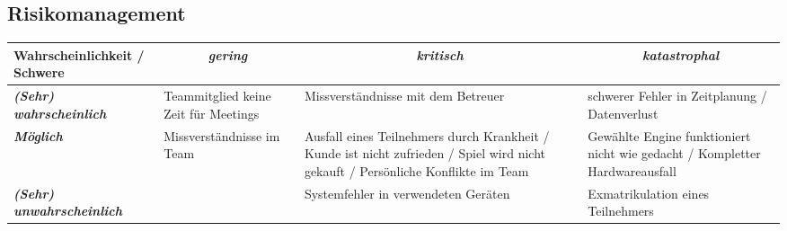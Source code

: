 

\subsection{Risikomanagement}
\begin{tabular}{|p{4cm}|p{3cm}|p{3.5cm}|p{3.5cm}|}
\hline
{\textbf{Wahrscheinlichkeit / Schwere}} & \multicolumn{1}{c|}{\textit{\textbf{gering}}}  & \multicolumn{1}{c|}{\textit{\textbf{kritisch}}}  	& \multicolumn{1}{c|}{\textit{\textbf{katastrophal}}} \\ \hline
\textit{\textbf{(Sehr) wahrscheinlich}} &
\cellcolor[HTML]{FCFF2F}Teammitglied keine Zeit für Meetings 	& \cellcolor[HTML]{FE0000}Missverständnisse mit dem Betreuer & \cellcolor[HTML]{FE0000}schwerer Fehler in Zeitplanung / Datenverlust     \\ \hline
\textit{\textbf{Möglich}}               &
\cellcolor[HTML]{34FF34}Missverständnisse im Team            	& \cellcolor[HTML]{F8FF00}Ausfall eines Teilnehmers durch Krankheit / Kunde ist nicht zufrieden / Spiel wird nicht gekauft / Persönliche Konflikte im Team & \cellcolor[HTML]{F8FF00}Gewählte Engine funktioniert nicht wie gedacht / Kompletter Hardwareausfall 				  \\ \hline
\textit{\textbf{(Sehr) unwahrscheinlich}}&
\cellcolor[HTML]{34FF34} & \cellcolor[HTML]{34FF34}Systemfehler in verwendeten Geräten & \cellcolor[HTML]{F8FF00}Exmatrikulation eines Teilnehmers                                               \\ \hline
\end{tabular}

